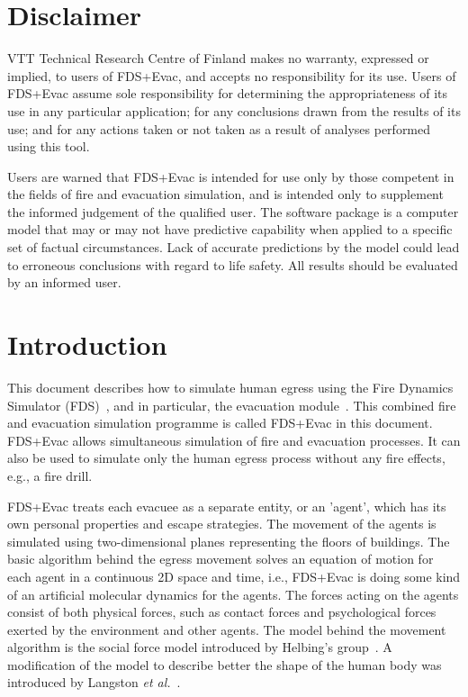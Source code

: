 \documentclass[12pt,a4paper,final,twoside]{stylevk}
\begin{document}
\newpage


\chapter*{Disclaimer}

\noindent VTT Technical Research Centre of Finland makes no warranty,
expressed or implied, to users of FDS+Evac, and accepts no
responsibility for its use.  Users of FDS+Evac assume sole
responsibility for determining the appropriateness of its use in any
particular application; for any conclusions drawn from the results of
its use; and for any actions taken or not taken as a result of
analyses performed using this tool.


Users are warned that FDS+Evac is intended for use only by those
competent in the fields of fire and evacuation simulation, and is
intended only to supplement the informed judgement of the qualified
user.  The software package is a computer model that may or may not
have predictive capability when applied to a specific set of factual
circumstances.  Lack of accurate predictions by the model could lead
to erroneous conclusions with regard to life safety.  All results
should be evaluated by an informed user.


\clearpage

\newpage


\tableofcontents

\newpage

\chapter{Introduction}\label{Sec_Intro}

\noindent This document describes how to simulate human egress using
the Fire Dynamics Simulator (FDS)~\cite{FDS_Manual, FDS_UserGuide,
  FDS_VVGuide1, FDS_VVGuide2}, and in particular, the evacuation
module~\cite{Korhonen05, Korhonen07a, Korhonen07b, Korhonen08a,
  Korhonen08b}.  This combined fire and evacuation simulation
programme is called FDS+Evac in this document.  FDS+Evac allows
simultaneous simulation of fire and evacuation processes.  It can also
be used to simulate only the human egress process without any fire
effects, e.g., a fire drill.


FDS+Evac treats each evacuee as a separate entity, or an 'agent',
which has its own personal properties and escape strategies.  The
movement of the agents is simulated using two-dimensional planes
representing the floors of buildings.  The basic algorithm behind the
egress movement solves an equation of motion for each agent in a
continuous 2D space and time, i.e., FDS+Evac is doing some kind
of an artificial molecular dynamics for the agents.  The forces acting
on the agents consist of both physical forces, such as contact forces
and psychological forces exerted by the environment and other agents.
The model behind the movement algorithm is the social force model
introduced by Helbing's group~\cite{Helbing95, Helbing00, Helbing02,
  Werner03}.  A modification of the model to describe better the shape
of the human body was introduced by Langston \emph{et
  al.}~\cite{Langston06}.
\end{document}
